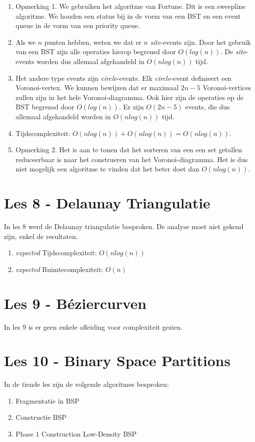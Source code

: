 \documentclass[12pt,a4paper]{article}
\begin{document}
		\begin{enumerate}
			\item Opmerking 1. We gebruiken het algoritme van Fortune. Dit is een sweepline algoritme. We houden een status bij in de vorm van een BST en een event queue in de vorm van een priority queue.
			\item Als we $n$ punten hebben, weten we dat er $n$ \emph{site}-events zijn. Door het gebruik van een BST zijn alle operaties hierop begrensd door $O(log (n))$. De \emph{site}-events worden dus allemaal afgehandeld in $O(n log (n))$ tijd. 
			\item Het andere type events zijn \emph{circle}-events. Elk \emph{circle}-event definieert een Voronoi-vertex. We kunnen bewijzen dat er maximaal $2n - 5$ Voronoi-vertices zullen zijn in het hele Voronoi-diagramma. Ook hier zijn de operaties op de BST begrensd door $O(log (n))$. Er zijn $O(2n - 5)$ events, die dus allemaal afgehandeld worden in $O(n log (n))$ tijd.
			\item Tijdscomplexiteit: $O(n log (n)) + O(n log (n)) = O(n log (n))$.				
			\item Opmerking 2. Het is aan te tonen dat het sorteren van een een set getallen reduceerbaar is naar het construeren van het Voronoi-diagramma. Het is dus niet mogelijk een algoritme te vinden dat het beter doet dan $O(n log (n))$. 
		\end{enumerate}
	
	\section{Les 8 - Delaunay Triangulatie}
		In les 8 werd de Delaunay triangulatie besproken. De analyse moet niet gekend zijn, enkel de resultaten. 
	
		\begin{enumerate}
			\item \emph{expected} Tijdscomplexiteit: $O(n log (n))$
			\item \emph{expected} Ruimtecomplexiteit: $O(n)$
		\end{enumerate}	
		
	\section{Les 9 - Béziercurven}
		In les 9 is er geen enkele afleiding voor complexiteit gezien. 
		
	\section{Les 10 - Binary Space Partitions}
		In de tiende les zijn de volgende algoritmes besproken:
		\begin{enumerate}
			\item Fragmentatie in BSP
			\item Constructie BSP
			\item Phase 1 Construction Low-Density BSP
		\end{enumerate}
	
\end{document}

